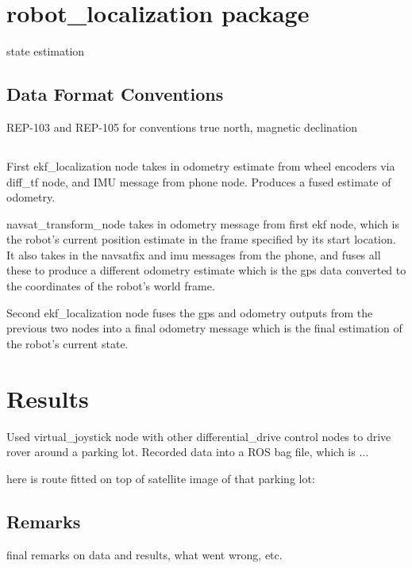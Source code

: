 \section{robot\_localization package}

state estimation
\subsection{Data Format Conventions}
REP-103 and REP-105 for conventions
true north, magnetic declination

\subsection{}
First ekf\_localization node takes in odometry estimate from wheel encoders via diff\_tf node, and IMU message from phone node. Produces a fused estimate of odometry.

navsat\_transform\_node takes in odometry message from first ekf node, which is the robot’s current position estimate in the frame specified by its start location. It also takes in the navsatfix and imu messages from the phone, and fuses all these to produce a different odometry estimate which is the gps data converted to the coordinates of the robot's world frame.

Second ekf\_localization node fuses the gps and odometry outputs from the previous two nodes into a final odometry message which is the final estimation of the robot's current state.


\cite{robot_localization_paper}

\section{Results}

Used virtual\_joystick node with other differential\_drive control nodes to drive rover around a parking lot. Recorded data into a ROS bag file, which is ...

here is route fitted on top of satellite image of that parking lot:

\subsection{Remarks}
final remarks on data and results, what went wrong, etc.